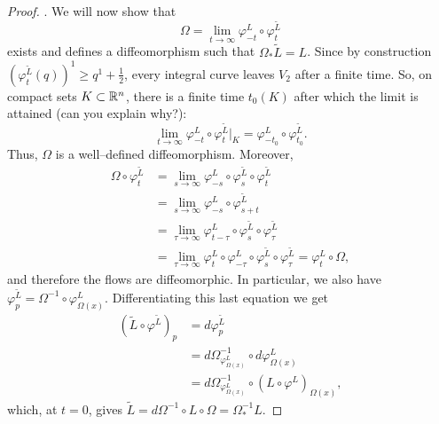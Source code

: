 \begin{proof}
  . We will now show that
  \begin{equation}
    \Omega = \lim_{t\to\infty} \varphi_{-t}^L \circ \varphi_t^{\widetilde{L}}
  \end{equation}
  exists and defines a diffeomorphism such that $\Omega_* \widetilde{L} = L$.
  Since by construction $(\varphi_t^{\widetilde{L}}(q))^1 \geq q^1 + \frac12$, every integral curve leaves $V_2$ after a finite time.
  So, on compact sets $K\subset\mathbb{R}^n$, there is a finite time $t_0(K)$ after which the limit is attained (can you explain why?):
  \begin{equation}
    \lim_{t\to\infty} \varphi_{-t}^L \circ \varphi_t^{\widetilde{L}}\Big|_K = \varphi_{-t_0}^L \circ \varphi_{t_0}^{\widetilde{L}}.
  \end{equation}
  Thus, $\Omega$ is a well--defined diffeomorphism.
  Moreover,
  \begin{align}
    \Omega \circ \varphi^{\widetilde{L}}_t & = \lim_{s\to\infty} \varphi_{-s}^L \circ \varphi^{\widetilde{L}}_s \circ \varphi^{\widetilde{L}}_t                                                          \\
                                           & = \lim_{s\to\infty} \varphi_{-s}^L \circ \varphi^{\widetilde{L}}_{s+t}                                                                                      \\
                                           & = \lim_{\tau\to\infty} \varphi_{t-\tau}^L \circ \varphi^{\widetilde{L}}_s \circ \varphi^{\widetilde{L}}_\tau                                                \\
                                           & = \lim_{\tau\to\infty} \varphi_{t}^L \circ \varphi_{-\tau}^L \circ \varphi^{\widetilde{L}}_s \circ \varphi^{\widetilde{L}}_\tau = \varphi_t^L \circ \Omega,
  \end{align}
  and therefore the flows are diffeomorphic.
  In particular, we also have $\varphi_p^{\widetilde{L}} = \Omega^{-1} \circ \varphi^L_{\Omega(x)}$.
  Differentiating this last equation we get
  \begin{align}
    (\widetilde{L} \circ \varphi^{\widetilde{L}})_p & = d\varphi^{\widetilde{L}}_p                                                  \\
                                                    & = d\Omega^{-1}_{\varphi^L_{\Omega(x)}} \circ d\varphi^L_{\Omega(x)}           \\
                                                    & = d\Omega^{-1}_{\varphi^L_{\Omega(x)}} \circ (L \circ \varphi^L)_{\Omega(x)},
  \end{align}
  which, at $t=0$, gives $\widetilde{L} = d\Omega^{-1} \circ L \circ \Omega = \Omega^{-1}_* L$.
\end{proof}

